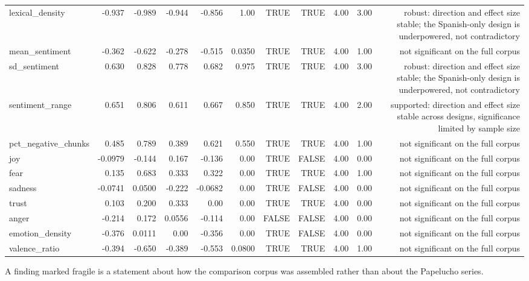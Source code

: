 \begin{table}[htbp]
\begin{tabular}{lrrrrrrrrrr}
lexical\_density & -0.937 & -0.989 & -0.944 & -0.856 & 1.00 & TRUE & TRUE & 4.00 & 3.00 & robust: direction and effect size stable; the Spanish-only design is underpowered, not contradictory \\
mean\_sentiment & -0.362 & -0.622 & -0.278 & -0.515 & 0.0350 & TRUE & TRUE & 4.00 & 1.00 & not significant on the full corpus \\
sd\_sentiment & 0.630 & 0.828 & 0.778 & 0.682 & 0.975 & TRUE & TRUE & 4.00 & 3.00 & robust: direction and effect size stable; the Spanish-only design is underpowered, not contradictory \\
sentiment\_range & 0.651 & 0.806 & 0.611 & 0.667 & 0.850 & TRUE & TRUE & 4.00 & 2.00 & supported: direction and effect size stable across designs, significance limited by sample size \\
pct\_negative\_chunks & 0.485 & 0.789 & 0.389 & 0.621 & 0.550 & TRUE & TRUE & 4.00 & 1.00 & not significant on the full corpus \\
joy & -0.0979 & -0.144 & 0.167 & -0.136 & 0.00 & TRUE & FALSE & 4.00 & 0.00 & not significant on the full corpus \\
fear & 0.135 & 0.683 & 0.333 & 0.322 & 0.00 & TRUE & TRUE & 4.00 & 1.00 & not significant on the full corpus \\
sadness & -0.0741 & 0.0500 & -0.222 & -0.0682 & 0.00 & TRUE & FALSE & 4.00 & 0.00 & not significant on the full corpus \\
trust & 0.103 & 0.200 & 0.333 & 0.00 & 0.00 & TRUE & TRUE & 4.00 & 0.00 & not significant on the full corpus \\
anger & -0.214 & 0.172 & 0.0556 & -0.114 & 0.00 & FALSE & FALSE & 4.00 & 0.00 & not significant on the full corpus \\
emotion\_density & -0.376 & 0.0111 & 0.00 & -0.356 & 0.00 & TRUE & FALSE & 4.00 & 0.00 & not significant on the full corpus \\
valence\_ratio & -0.394 & -0.650 & -0.389 & -0.553 & 0.0800 & TRUE & TRUE & 4.00 & 1.00 & not significant on the full corpus \\
\bottomrule
\end{tabular}
\vspace{0.5em}
\begin{minipage}{\linewidth}\footnotesize A finding marked fragile is a statement about how the comparison corpus was assembled rather than about the Papelucho series.\end{minipage}
\end{table}

